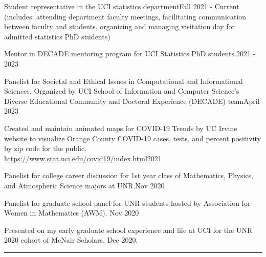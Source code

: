\documentclass{article}
\begin{document}
	


\begin{description}
	\vspace{-2mm}
	\item[Professional Service and Outreach]\hspace*{.1in} 
	
		Student representative in the UCI statistics department\hfill{Fall 2021 - Current}\\
		(includes: attending department faculty meetings, facilitating communication between faculty and students, organizing and managing visitation day for admitted statistics PhD students)
		
		Mentor in DECADE mentoring program for UCI Statistics PhD students.\hfill{2021 - 2023} \\ \vspace{-3mm}
	
		Panelist for Societal and Ethical Issues in Computational and Informational Sciences. Organized by UCI School of Information and Computer Science's Diverse Educational Community and Doctoral Experience (DECADE) team\hfill{April 2023}
	
		Created and maintain animated maps for COVID-19 Trends by UC Irvine website to visualize Orange County COVID-19 cases, tests, and percent positivity by zip code for the public.\\
		\url{https://www.stat.uci.edu/covid19/index.html}\hfill{2021} \\ \vspace{-3mm}
	
		Panelist for college career discussion for 1st year class of Mathematics, Physics, and Atmospheric Science majors at UNR.\hfill{Nov 2020}\\ \vspace{-3mm}
		
		Panelist for graduate school panel for UNR students hosted by Association for Women in Mathematics (AWM). \hfill{Nov 2020}\\ \vspace{-3mm}
		
		Presented on my early graduate school experience and life at UCI for the UNR 2020 cohort of McNair Scholars. \hfill{Dec 2020}.
	
\end{description}
\vspace{-2mm}
\rule{\linewidth}{1pt}


\end{document}
